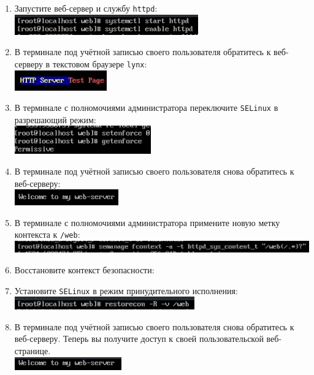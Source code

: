 \documentclass[12pt]{article}
\begin{document}
\begin{enumerate}
	\item Запустите веб-сервер и службу \texttt{httpd}:
	      \\\includegraphics{18.png}
	\item В терминале под учётной записью своего пользователя обратитесь к веб-серверу в текстовом браузере \texttt{lynx}:
	      \\\includegraphics{19.png}
	\item В терминале с полномочиями администратора переключите \texttt{SELinux} в разрешающий режим:
	      \\\includegraphics{20.png}
	\item В терминале под учётной записью своего пользователя снова обратитесь к веб-серверу:
	      \\\includegraphics{21.png}
	\item В терминале с полномочиями администратора примените новую метку контекста к \texttt{/web}:
	      \\\includegraphics{22.png}
	\item Восстановите контекст безопасности:
	\item Установите \texttt{SELinux} в режим принудительного исполнения:
	      \\\includegraphics{23.png}
	\item В терминале под учётной записью своего пользователя снова обратитесь к веб-серверу. Теперь вы получите доступ к своей пользовательской веб-странице.
	      \\\includegraphics{24.png}
\end{enumerate}
\end{document}
